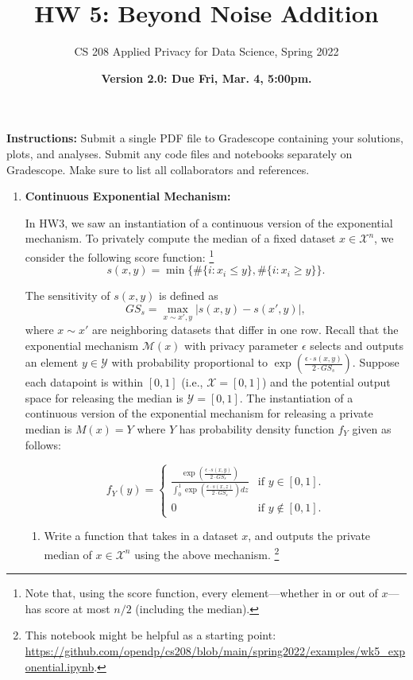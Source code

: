 \documentclass[11pt]{article}
\title{\vspace{-1.5cm} HW 5: Beyond Noise Addition
}
\author{CS 208 Applied Privacy for Data Science, Spring 2022}
\date{\textbf{Version 2.0: Due Fri, Mar. 4, 5:00pm.}}
\newcommand{\instructions}{\noindent \textbf{Instructions:} Submit a single PDF file to Gradescope containing your solutions, plots, and analyses. Submit any code files and notebooks separately on Gradescope. Make sure to list all collaborators and references.}
\newcommand{\calX}{\mathcal{X}}
\begin{document}
    \maketitle

    \instructions

    \begin{enumerate}[leftmargin=*]

        \item \textbf{Continuous Exponential Mechanism:}

        In HW3, we saw an instantiation of a continuous version
        of the exponential mechanism. To privately compute the median of a fixed dataset $x\in \mathcal{X}^n$, we consider the following score function:
        \footnote{Note that, using the score function,
            every element---whether in or out of $x$---has
            score at most $n/2$ (including the median).}
        $$s(x,y)=\min\{\#\{i: x_i\le y\},\#\{i: x_i\ge y\}\}.$$

        The sensitivity of $s(x,y)$ is defined as
        $$GS_s=\max_{x\sim x', y}|s(x,y)-s(x',y)|,$$
        where $x\sim x'$ are neighboring datasets that differ in
        one row.
        Recall that the exponential mechanism $\mathcal{M}(x)$ with privacy parameter $\epsilon$ selects and outputs an element $y\in \mathcal{Y}$ with probability proportional to $\exp\left(\frac{\epsilon\cdot s(x,y)}{2\cdot GS_s}\right)$. Suppose each datapoint is within $[0,1]$
        (i.e., $\mathcal{X}=[0,1]$) and
        the potential output space for releasing the median is $\mathcal{Y}=[0,1]$.
        The instantiation of a continuous version
        of the exponential mechanism for releasing a private median is
        $M(x) = Y$ where $Y$ has probability density function $f_Y$ given as follows:

        $$f_Y(y) = \begin{cases}
                       \frac{\exp\left(\frac{\epsilon\cdot s(x,y)}{2\cdot GS_s}\right)}{\int_0^1 \exp\left(\frac{\epsilon\cdot s(x,z)}{2\cdot GS_s}\right) dz} & \text{if } y\in [0,1].\\
                       0 & \text{if } y\notin [0,1].
        \end{cases}$$

        \begin{enumerate}
            \item Write a function that takes in a dataset $x$, and outputs the private median of $x\in\calX^n$ using the above mechanism.
            \footnote{This notebook might be helpful as a starting point: \url{https://github.com/opendp/cs208/blob/main/spring2022/examples/wk5_exponential.ipynb}.}


\end{enumerate}
\end{enumerate}
\end{document}
